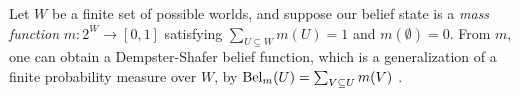 \begin{example} \label{ex:shafer}
Let $W$ be a finite set of possible worlds, 
and suppose our belief state is a 
\emph{mass function} $m : 2^W \! \to\! [0,1]$
satisfying $\sum_{U \subseteq W} m(U) \!=\! 1$ 
and $m(\emptyset) \!=\! 0$. 
From $m$, one can obtain 
a Dempster-Shafer belief function, 
which is a generalization of a finite probability measure over $W$, by
$\mathrm{Bel}_m(U) = \sum_{V \subseteq U} m(V)$
\parencite{shafer1976mathematical}.
%


\end{example}
